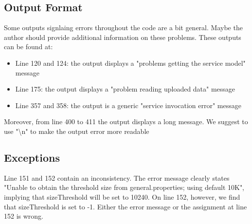 \documentclass{article}
\begin{document}
\subsection{Output Format}
Some outputs signlaing errors throughout the code are a bit general. Maybe the author should provide additional information on these problems. These outputs can be found at:
\begin{itemize}[noitemsep]
\item Line 120 and 124: the output displays a "problems getting the service model" message
\item Line 175: the output displays a "problem reading uploaded data" message
\item Line 357 and 358: the output is a generic "service invocation error" message
\end{itemize}
Moreover, from line 400 to 411 the output displays a long message. We suggest to use "\textbackslash n" to make the output error more readable
\subsection{Exceptions}
Line 151 and 152 contain an inconsistency. The error message clearly states "Unable to obtain the threshold size from general.properties; using default 10K", implying that sizeThreshold will be set to 10240. On line 152, however, we find that sizeThreshold is set to -1. Either the error message or the assignment at line 152 is wrong.
\end{document}
